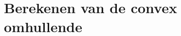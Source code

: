 \documentclass[tmi_notities.tex]{subfiles}
\begin{document}
\chapter{Berekenen van de convex omhullende}
\end{document}
